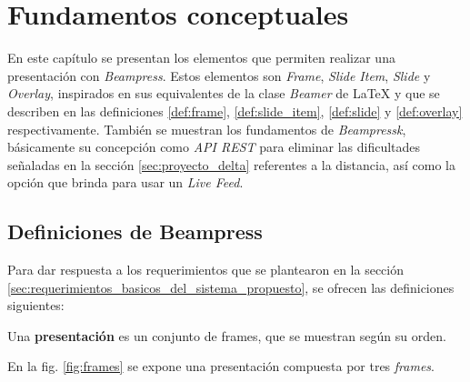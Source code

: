 
\chapter{Fundamentos conceptuales} %
\label{cha:fundamentos_conceptuales}
	En este capítulo se presentan los elementos que permiten realizar una presentación con \textit{Beampress}. Estos elementos son \textit{Frame}, \textit{Slide Item}, \textit{Slide} y \textit{Overlay}, inspirados en sus equivalentes de la clase \textit{Beamer} de \LaTeX{} y que se describen en las definiciones \ref{def:frame}, \ref{def:slide_item}, \ref{def:slide} y \ref{def:overlay} respectivamente. También se muestran los fundamentos de \textit{Beampressk}, básicamente su concepción como \textit{API REST} para eliminar las dificultades señaladas en la sección \ref{sec:proyecto_delta} referentes a la distancia, así como la opción que brinda para usar un \textit{Live Feed}. 

	\section{Definiciones de Beampress} %
	\label{sec:definiciones_de_beampress}
		Para dar respuesta a los requerimientos que se plantearon en la sección \ref{sec:requerimientos_basicos_del_sistema_propuesto}, se ofrecen las definiciones siguientes:

		
 		\begin{definition}
 		\label{def:presentation}
			Una \textbf{presentación} es un conjunto de \textnormal{frames}, que se muestran según su orden.
 		\end{definition}

 		En la fig. \ref{fig:frames} se expone una presentación compuesta por tres \textit{frames}.

